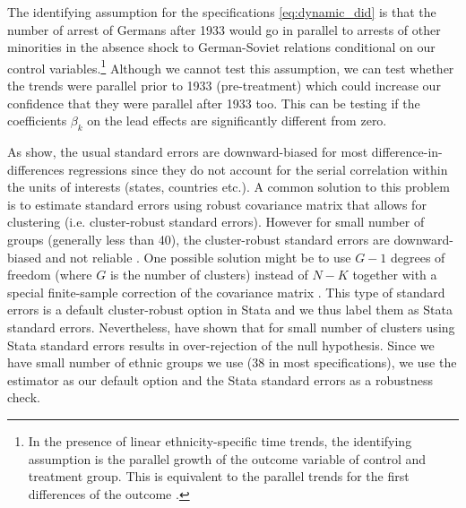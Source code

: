 The identifying assumption for the specifications \ref{eq:dynamic_did} is that the number of arrest of Germans after 1933 would go in parallel to arrests of other minorities in the absence shock to German-Soviet relations conditional on our control variables.\footnote{In the presence of linear ethnicity-specific time trends, the identifying assumption  is the parallel growth of the outcome variable of control and treatment group. This is equivalent to the parallel trends for the first differences of the outcome \citep{mora_alternative_2019}. } Although we cannot test this assumption, we can test whether the trends were parallel prior to 1933 (pre-treatment) which could increase our confidence that they were parallel after 1933 too. This can be testing if the coefficients $\beta_k$ on the lead effects are significantly different from zero.  

As \citet{bertrand_how_2004} show, the usual standard errors  are downward-biased for most difference-in-differences regressions since they do not account for the serial correlation within the units of interests (states, countries etc.). A common solution to this problem is to estimate standard errors using robust covariance matrix that allows for clustering (i.e. cluster-robust standard errors). However for small number of groups (generally less than 40), the cluster-robust standard errors are downward-biased and not reliable \citep[chapter 8]{donald_inference_2007, angrist_mostly_2009}.
One possible solution might be to use $G - 1$ degrees of freedom  (where $G$ is the number of clusters) instead of $N - K$ 
together with a special finite-sample correction of the covariance matrix \citep{angrist_mostly_2009, cameron_practitioners_2015, imbens_robust_2016}.
 This type of standard errors is a default cluster-robust option in Stata and we thus label them as Stata  standard errors. 
Nevertheless, \citet{imbens_robust_2016} have shown  that for small number of clusters using Stata standard errors  results in over-rejection of the null hypothesis. 
Since we have small number of ethnic groups we use (38 in most specifications), we use the  \citet{pustejovsky_small-sample_2018} estimator as our default option and the Stata  standard errors as a robustness check. 



